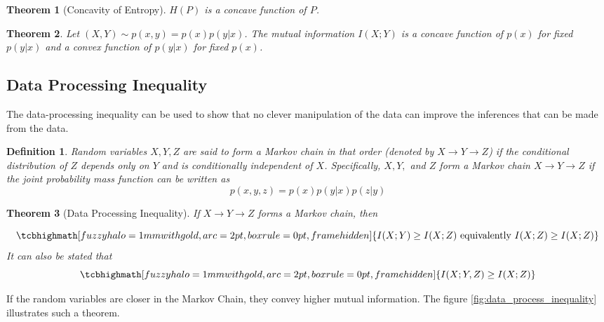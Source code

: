\documentclass[a4paper,10pt]{article}
\newtheorem{theorem}{Theorem}
\newcommand{\equationgold}[1]{
  \tcbhighmath[fuzzy halo=1mm with gold,arc=2pt,boxrule=0pt,frame hidden]{#1}
}
\newtheorem{definition}{Definition}[section] %
\newcommand{\hlt}[1]{\colorbox{color3}{#1}}
\begin{document}
\begin{theorem}[Concavity of Entropy]
    $H(P)$ is a \hlt{concave} function of $P$.
\end{theorem}

\begin{theorem}
    Let $(X, Y) \sim p(x, y) = p(x)p(y | x)$. The mutual information $I(X; Y)$ is a concave function of $p(x)$ for fixed $p(y|x)$ and a convex function of $p(y|x)$ for fixed $p(x)$.
\end{theorem}

\subsection{Data Processing Inequality}

The data-processing inequality can be used to show that \hlt{no} clever manipulation of the data can \hlt{improve} the inferences that can be made from the data.

\begin{definition}
    Random variables $X, Y, Z$ are said to form a Markov chain in that order (denoted by $X \rightarrow Y \rightarrow Z$) if the conditional distribution of $Z$ depends only on $Y$ and is conditionally independent of $X$. Specifically, $X, Y,$ and $Z$ form a Markov chain $X \rightarrow Y \rightarrow Z$ if the joint probability mass function can be written as 
    \begin{equation}
        p(x, y, z) = p(x)p(y|x)p(z|y)
    \end{equation}
\end{definition}

\begin{theorem}[Data Processing Inequality]\label{theo:data_proc_ineq}
    If $X \rightarrow Y \rightarrow Z$ forms a Markov chain, then 

    \begin{equation}
        \equationgold{
            I(X; Y) \geq I(X; Z) \text{ equivalently } I(X; Z) \geq I(X; Z)
        }
    \end{equation}
    It can also be stated that 
    \begin{equation}
        \equationgold{
            I(X; Y, Z) \geq I(X; Z)
        }
    \end{equation}
\end{theorem}

If the random variables are \hlt{closer} in the Markov Chain, they convey higher mutual information. The figure \ref{fig:data_process_inequality} illustrates such a theorem.
\end{document}
